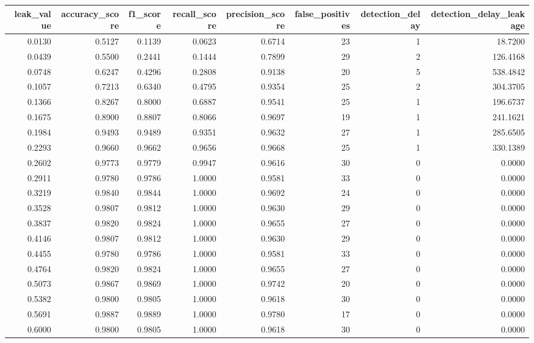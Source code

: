 \begin{tabular}{rrrrrrrr}
\toprule
leak\_value & accuracy\_score & f1\_score & recall\_score & precision\_score & false\_positives & detection\_delay & detection\_delay\_leakage \\
\midrule
0.0130 & 0.5127 & 0.1139 & 0.0623 & 0.6714 & 23 & 1 & 18.7200 \\
0.0439 & 0.5500 & 0.2441 & 0.1444 & 0.7899 & 29 & 2 & 126.4168 \\
0.0748 & 0.6247 & 0.4296 & 0.2808 & 0.9138 & 20 & 5 & 538.4842 \\
0.1057 & 0.7213 & 0.6340 & 0.4795 & 0.9354 & 25 & 2 & 304.3705 \\
0.1366 & 0.8267 & 0.8000 & 0.6887 & 0.9541 & 25 & 1 & 196.6737 \\
0.1675 & 0.8900 & 0.8807 & 0.8066 & 0.9697 & 19 & 1 & 241.1621 \\
0.1984 & 0.9493 & 0.9489 & 0.9351 & 0.9632 & 27 & 1 & 285.6505 \\
0.2293 & 0.9660 & 0.9662 & 0.9656 & 0.9668 & 25 & 1 & 330.1389 \\
0.2602 & 0.9773 & 0.9779 & 0.9947 & 0.9616 & 30 & 0 & 0.0000 \\
0.2911 & 0.9780 & 0.9786 & 1.0000 & 0.9581 & 33 & 0 & 0.0000 \\
0.3219 & 0.9840 & 0.9844 & 1.0000 & 0.9692 & 24 & 0 & 0.0000 \\
0.3528 & 0.9807 & 0.9812 & 1.0000 & 0.9630 & 29 & 0 & 0.0000 \\
0.3837 & 0.9820 & 0.9824 & 1.0000 & 0.9655 & 27 & 0 & 0.0000 \\
0.4146 & 0.9807 & 0.9812 & 1.0000 & 0.9630 & 29 & 0 & 0.0000 \\
0.4455 & 0.9780 & 0.9786 & 1.0000 & 0.9581 & 33 & 0 & 0.0000 \\
0.4764 & 0.9820 & 0.9824 & 1.0000 & 0.9655 & 27 & 0 & 0.0000 \\
0.5073 & 0.9867 & 0.9869 & 1.0000 & 0.9742 & 20 & 0 & 0.0000 \\
0.5382 & 0.9800 & 0.9805 & 1.0000 & 0.9618 & 30 & 0 & 0.0000 \\
0.5691 & 0.9887 & 0.9889 & 1.0000 & 0.9780 & 17 & 0 & 0.0000 \\
0.6000 & 0.9800 & 0.9805 & 1.0000 & 0.9618 & 30 & 0 & 0.0000 \\
\bottomrule
\end{tabular}
